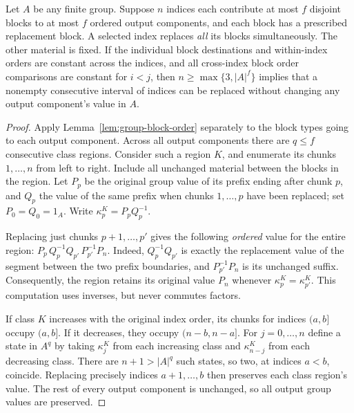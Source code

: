 \begin{lemma}
\label{lem:group-interval}
Let $A$ be any finite group.  Suppose $n$ indices each
contribute at most $f$ disjoint blocks to at most $f$
ordered output components, and each block has a prescribed
replacement block.  A selected index replaces \emph{all}
its blocks simultaneously.  The other material is fixed.
If the individual block destinations and within-index orders
are constant across the indices, and all cross-index block
order comparisons are constant for $i<j$, then
$n\ge\max\{3,|A|^f\}$ implies that a nonempty consecutive
interval of indices can be replaced without changing
any output component's value in $A$.
\end{lemma}
\begin{proof}
Apply Lemma~\ref{lem:group-block-order} separately to
the block types going to each output component.  Across
all output components there are $q\le f$ consecutive
class regions.  Consider such a region $K$, and enumerate
its chunks $1,\ldots,n$ from left to right.  Include all
unchanged material between the blocks in the region.
Let $P_p$ be the original group value of its prefix
ending after chunk $p$, and $Q_p$ the value of the
same prefix when chunks $1,\ldots,p$ have been
replaced; set $P_0=Q_0=1_A$.  Write
$\kappa^K_p=P_pQ_p^{-1}$.

Replacing just chunks $p+1,\ldots,p'$ gives the
following \emph{ordered} value for the entire region:
\(P_p\,Q_p^{-1}Q_{p'}\,P_{p'}^{-1}P_n\).
Indeed, $Q_p^{-1}Q_{p'}$ is exactly the replacement
value of the segment between the two prefix boundaries,
and $P_{p'}^{-1}P_n$ is its unchanged suffix.
Consequently, the region retains its original value
$P_n$ whenever $\kappa^K_p=\kappa^K_{p'}$.
This computation uses inverses, but never commutes
factors.

If class $K$ increases with the original index order,
its chunks for indices $(a,b]$ occupy $(a,b]$.
If it decreases, they occupy $(n-b,n-a]$.
For $j=0,\ldots,n$ define a state in $A^q$ by taking
$\kappa^K_j$ from each increasing class and
$\kappa^K_{n-j}$ from each decreasing class.
There are $n+1>|A|^q$ such states, so two,
at indices $a<b$, coincide.  Replacing precisely
indices $a+1,\ldots,b$ then preserves each
class region's value.  The rest of every output
component is unchanged, so all output group values
are preserved.
\end{proof}

